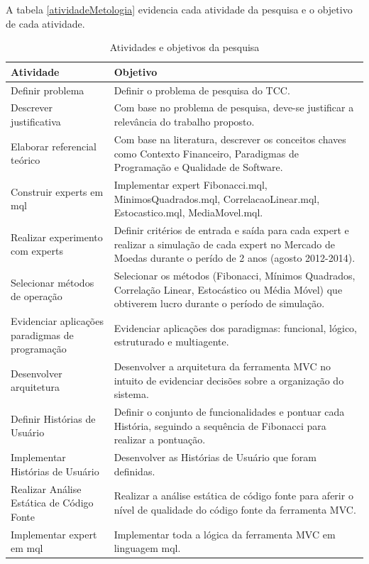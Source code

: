 A tabela \ref{atividadeMetologia}  evidencia cada atividade da pesquisa e o objetivo de cada atividade.

\begin{table}[H]
\caption{Atividades e objetivos da pesquisa}
\begin{center}
    \begin{tabular}{ |  p{5cm} | p{9cm}|}
    \hline
    \textbf{Atividade} & \textbf{Objetivo} \\ \hline
	Definir problema & Definir o problema de pesquisa do TCC.\\ \hline
	Descrever justificativa & Com base no problema de pesquisa, deve-se justificar a relevância do trabalho proposto.\\ \hline
	Elaborar referencial teórico & Com base na literatura, descrever os conceitos chaves como Contexto Financeiro, Paradigmas de Programação e Qualidade de Software.\\ \hline
	Construir experts em mql & Implementar expert Fibonacci.mql, MinimosQuadrados.mql, CorrelacaoLinear.mql, Estocastico.mql, MediaMovel.mql. \\ \hline
	Realizar experimento com experts & Definir critérios de entrada e saída para cada expert e realizar a simulação de cada expert no Mercado de Moedas durante o perído de 2 anos (agosto 2012-2014).\\ \hline
	Selecionar métodos de operação & Selecionar os métodos (Fibonacci, Mínimos Quadrados, Correlação Linear, Estocástico ou Média Móvel) que obtiverem lucro durante o período de simulação.\\ \hline
	Evidenciar aplicações paradigmas de programação & Evidenciar aplicações dos paradigmas: funcional, lógico, estruturado e multiagente.\\ \hline
	Desenvolver arquitetura & Desenvolver a arquitetura da ferramenta MVC no intuito de evidenciar decisões sobre a organização do sistema.\\ \hline
	Definir Histórias de Usuário & Definir o conjunto de funcionalidades e pontuar cada História, seguindo a sequência de Fibonacci para realizar a pontuação.\\ \hline
	Implementar Histórias de Usuário & Desenvolver as Histórias de Usuário que foram definidas.\\ \hline
	Realizar Análise Estática de Código Fonte & Realizar a análise estática de código fonte para aferir o nível de qualidade do código fonte da ferramenta MVC.\\ \hline
	Implementar expert em mql & Implementar toda a lógica da ferramenta MVC em linguagem mql.\\ \hline

\end{tabular}
\end{center}
\end{table}
